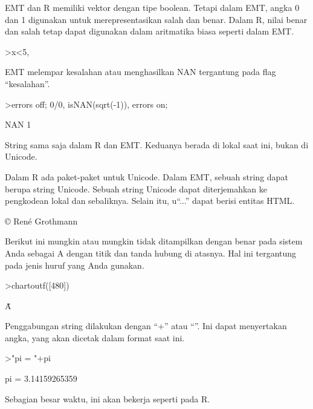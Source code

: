 \documentclass{article}
\begin{document}
\begin{eulernotebook}
\begin{eulercomment}
EMT dan R memiliki vektor dengan tipe boolean. Tetapi dalam EMT, angka
0 dan 1 digunakan untuk merepresentasikan salah dan benar. Dalam R,
nilai benar dan salah tetap dapat digunakan dalam aritmatika biasa
seperti dalam EMT.
\end{eulercomment}
\begin{eulerprompt}
>x<5, %
\end{eulerprompt}
\begin{euleroutput}
  [0,  0,  1,  0,  0]
  [0,  0,  3.1,  0,  0]
\end{euleroutput}
\begin{eulercomment}
EMT melempar kesalahan atau menghasilkan NAN tergantung pada flag
“kesalahan”.
\end{eulercomment}
\begin{eulerprompt}
>errors off; 0/0, isNAN(sqrt(-1)), errors on;
\end{eulerprompt}
\begin{euleroutput}
  NAN
  1
\end{euleroutput}
\begin{eulercomment}
String sama saja dalam R dan EMT. Keduanya berada di lokal saat ini,
bukan di Unicode.

Dalam R ada paket-paket untuk Unicode. Dalam EMT, sebuah string dapat
berupa string Unicode. Sebuah string Unicode dapat diterjemahkan ke
pengkodean lokal dan sebaliknya. Selain itu, u“...” dapat berisi
entitas HTML.
\end{eulercomment}
\begin{euleroutput}
  © René Grothmann
\end{euleroutput}
\begin{eulercomment}
Berikut ini mungkin atau mungkin tidak ditampilkan dengan benar pada
sistem Anda sebagai A dengan titik dan tanda hubung di atasnya. Hal
ini tergantung pada jenis huruf yang Anda gunakan.
\end{eulercomment}
\begin{eulerprompt}
>chartoutf([480])
\end{eulerprompt}
\begin{euleroutput}
  Ǡ
\end{euleroutput}
\begin{eulercomment}
Penggabungan string dilakukan dengan “+” atau “\textbar{}”. Ini dapat
menyertakan angka, yang akan dicetak dalam format saat ini.
\end{eulercomment}
\begin{eulerprompt}
>"pi = "+pi
\end{eulerprompt}
\begin{euleroutput}
  pi = 3.14159265359
\end{euleroutput}
\begin{eulercomment}
Sebagian besar waktu, ini akan bekerja seperti pada R.


\end{eulercomment}
\end{eulernotebook}
\end{document}
